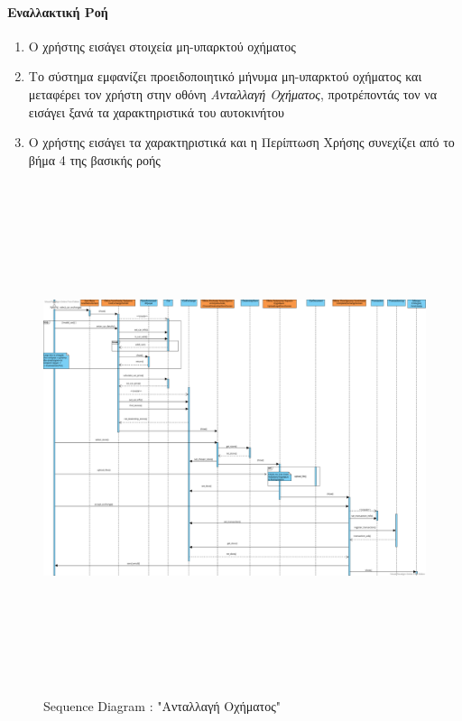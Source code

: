 \documentclass{../ol-softwaremanual}
\begin{document}
	\paragraph{{Εναλλακτική Ροή}}
	
	\begin{enumerate}
		\item Ο χρήστης εισάγει στοιχεία μη-υπαρκτού οχήματος
		\item Το σύστημα εμφανίζει προειδοποιητικό μήνυμα μη-υπαρκτού οχήματος και μεταφέρει τον χρήστη στην οθόνη \textit{Ανταλλαγή Οχήματος}, προτρέποντάς τον να εισάγει ξανά τα χαρακτηριστικά του αυτοκινήτου
		\item Ο χρήστης εισάγει τα χαρακτηριστικά και η Περίπτωση Χρήσης συνεχίζει από το βήμα 4 της βασικής ροής
	\end{enumerate}
	
	\newpage
	
	\begin{figure}[htbp!]
		\centering
		\includegraphics[height=15cm, width=\textwidth+3cm]{img/seq_car_exchange.png}
		\caption{\en Sequence Diagram : "\gr Ανταλλαγή Οχήματος\en"\gr}
	\end{figure}
	
\end{document}
